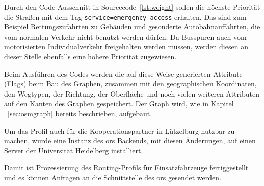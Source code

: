 
Durch den Code-Ausschnitt in Sourcecode~\ref{lst:weight} sollen die höchste Priorität die Straßen mit dem Tag \texttt{service=emergency\_access} erhalten.
Das sind zum Beispiel Rettungszufahrten zu Gebäuden und gesonderte Autobahnauffahrten, die vom normalen Verkehr nicht benutzt werden dürfen.
Da Busspuren auch vom motorisierten Individualverkehr freigehalten werden müssen, werden diesen an dieser Stelle ebenfalls eine höhere Priorität zugewiesen.

Beim Ausführen des Codes werden die auf diese Weise generierten Attribute (Flags) beim Bau des Graphen, zusammen mit den geographischen Koordinaten, den Wegtypen, der Richtung, der Oberfläche und noch vielen weiteren Attributen auf den Kanten des Graphen gespeichert.
Der Graph wird, wie in Kapitel ~\ref{sec:osmgraph} bereits beschrieben, aufgebaut.


Um das Profil auch für die Kooperationspartner in Lützelburg nutzbar zu machen, wurde eine Instanz des \gls{ors} Backends, mit diesen Änderungen, auf einen Server der Universität Heidelberg installiert.

Damit ist Prozessierung des Routing-Profils für Einsatzfahrzeuge fertiggestellt und es können Anfragen an die Schnittstelle des \gls{ors} gesendet werden.


